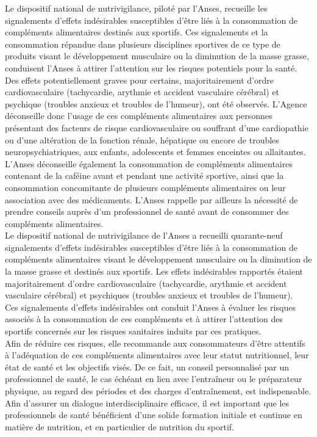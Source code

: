 \documentclass[8pt]{article}
\begin{document}
Le dispositif national de nutrivigilance, piloté par l’Anses, recueille les signalements d’effets indésirables susceptibles d’être liés à la consommation de compléments alimentaires destinés aux sportifs. Ces signalements et la consommation répandue dans plusieurs disciplines sportives de ce type de produits visant le développement musculaire ou la diminution de la masse grasse, conduisent l’Anses à attirer l’attention sur les risques potentiels pour la santé. Des effets potentiellement graves pour certains, majoritairement d’ordre cardiovasculaire (tachycardie, arythmie et accident vasculaire cérébral) et psychique (troubles anxieux et troubles de l’humeur), ont été observés. L’Agence déconseille donc l’usage de ces compléments alimentaires aux personnes présentant des facteurs de risque cardiovasculaire ou souffrant d’une cardiopathie ou d’une altération de la fonction rénale, hépatique ou encore de troubles neuropsychiatriques, aux enfants, adolescents et femmes enceintes ou allaitantes. L’Anses déconseille également la consommation de compléments alimentaires contenant de la caféine avant et pendant une activité sportive, ainsi que la consommation concomitante de plusieurs compléments alimentaires ou leur association avec des médicaments. L’Anses rappelle par ailleurs la nécessité de prendre conseils auprès d’un professionnel de santé avant de consommer des compléments alimentaires.\\



Le dispositif national de nutrivigilance de l’Anses a recueilli quarante-neuf signalements d’effets indésirables susceptibles d’être liés à la consommation de compléments alimentaires visant le développement musculaire ou la diminution de la masse grasse et destinés aux sportifs. Les effets indésirables rapportés étaient majoritairement d’ordre cardiovasculaire (tachycardie, arythmie et accident vasculaire cérébral) et psychiques (troubles anxieux et troubles de l’humeur).\\

Ces signalements d’effets indésirables ont conduit l’Anses à évaluer les risques associés à la consommation de ces compléments et à attirer l’attention des sportifs concernés sur les risques sanitaires induits par ces pratiques.\\

Afin de réduire ces risques, elle recommande aux consommateurs d’être attentifs à l’adéquation de ces compléments alimentaires avec leur statut nutritionnel, leur état de santé et les objectifs visés. De ce fait, un conseil personnalisé par un professionnel de santé, le cas échéant en lien avec l’entraîneur ou le préparateur physique, au regard des périodes et des charges d’entraînement, est indispensable. Afin d’assurer un dialogue interdisciplinaire efficace, il est important que les professionnels de santé bénéficient d’une solide formation initiale et continue en matière de nutrition, et en particulier de nutrition du sportif.\\
\end{document}
